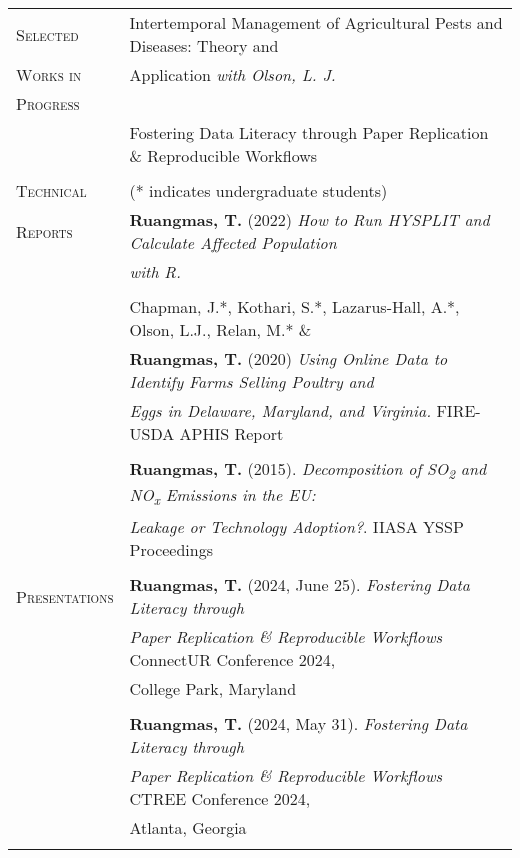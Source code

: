 \documentclass[letterpaper,11pt,oneside]{article}\usepackage[]{graphicx}\usepackage[]{xcolor}
\begin{document}
\begin{tabular}{p{1.2in} l}
\textsc{Selected}	& Intertemporal Management of Agricultural Pests and Diseases: Theory and \\			
\textsc{Works in} & Application \textit{with Olson, L. J.}\\
\textsc{Progress} & \\
                  & Fostering Data Literacy through Paper Replication \& Reproducible Workflows \\
                  & \\
\textsc{Technical}  & (* indicates undergraduate students) \\
\textsc{Reports}    & \textbf{Ruangmas, T.} (2022) \textit{How to Run HYSPLIT and Calculate Affected Population} \\
                    & \textit{with R.} \href{https://ruangmas.github.io/hysplit.html}{\color{blue}{[LINK]}} \\
                    & \\
                        & Chapman, J.*, Kothari, S.*, Lazarus-Hall, A.*, Olson, L.J., Relan, M.* \& \\
                        & \textbf{Ruangmas, T.} (2020) \textit{Using Online Data to Identify Farms Selling Poultry and} \\
                        & \textit{Eggs in Delaware, Maryland, and Virginia.} FIRE-USDA APHIS Report\\
                        & \\
                        & \textbf{Ruangmas, T.} (2015). \textit{Decomposition of SO\textsubscript{2} and NO\textsubscript{x} Emissions in the EU:}  \\
                        &  \textit{Leakage or Technology Adoption?}. IIASA YSSP Proceedings \href{https://previous.iiasa.ac.at/web/scientificUpdate/2014/Ruangmas_Thanicha.html}{\color{blue}{[LINK]}} \\
                        & \\
\textsc{Presentations} & \textbf{Ruangmas, T.} (2024, June 25). \textit{Fostering Data Literacy through} \\
                        & \textit{Paper Replication \& Reproducible Workflows} ConnectUR Conference 2024, \\
                        & College Park, Maryland \\
                        & \\
                        & \textbf{Ruangmas, T.} (2024, May 31). \textit{Fostering Data Literacy through}\\
                        & \textit{Paper Replication \& Reproducible Workflows} CTREE Conference 2024, \\
                        & Atlanta, Georgia\\
                        & \\
\end{tabular}                        
\end{document}
